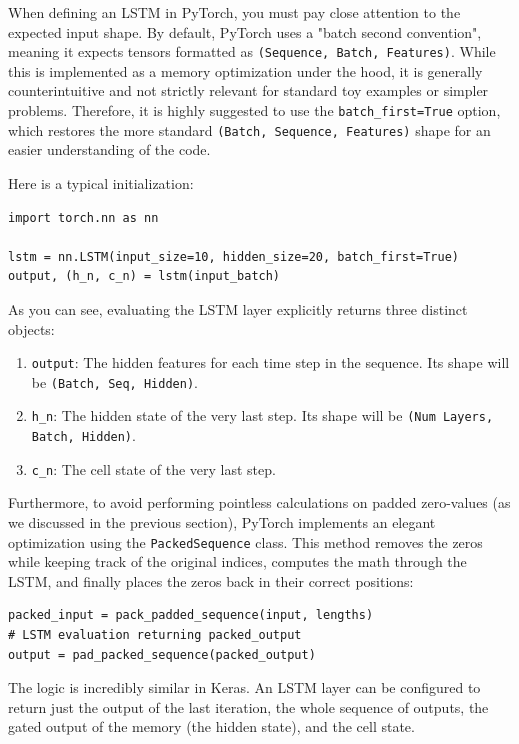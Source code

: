 When defining an LSTM in PyTorch, you must pay close attention to the expected input shape. By default, PyTorch uses a "batch second convention", meaning it expects tensors formatted as \texttt{(Sequence, Batch, Features)}. While this is implemented as a memory optimization under the hood, it is generally counterintuitive and not strictly relevant for standard toy examples or simpler problems. Therefore, it is highly suggested to use the \texttt{batch\_first=True} option, which restores the more standard \texttt{(Batch, Sequence, Features)} shape for an easier understanding of the code.

Here is a typical initialization:

\begin{verbatim}
import torch.nn as nn

lstm = nn.LSTM(input_size=10, hidden_size=20, batch_first=True)
output, (h_n, c_n) = lstm(input_batch)
\end{verbatim}

As you can see, evaluating the LSTM layer explicitly returns three distinct objects:
\begin{enumerate}
    \item \texttt{output}: The hidden features for each time step in the sequence. Its shape will be \texttt{(Batch, Seq, Hidden)}.
    \item \texttt{h\_n}: The hidden state of the very last step. Its shape will be \texttt{(Num Layers, Batch, Hidden)}.
    \item \texttt{c\_n}: The cell state of the very last step.
\end{enumerate}

Furthermore, to avoid performing pointless calculations on padded zero-values (as we discussed in the previous section), PyTorch implements an elegant optimization using the \texttt{PackedSequence} class. This method removes the zeros while keeping track of the original indices, computes the math through the LSTM, and finally places the zeros back in their correct positions:

\begin{verbatim}
packed_input = pack_padded_sequence(input, lengths)
# LSTM evaluation returning packed_output
output = pad_packed_sequence(packed_output)
\end{verbatim}

The logic is incredibly similar in Keras. An LSTM layer can be configured to return just the output of the last iteration, the whole sequence of outputs, the gated output of the memory (the hidden state), and the cell state. 

